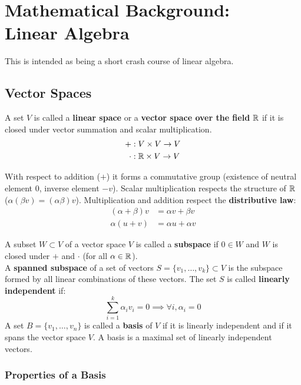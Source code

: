 \section[Mathematical Background: Linear Algebra]
	{Mathematical Background:\\Linear Algebra}%
\label{sec:linear_algebra}

This is intended as being a short crash course of linear algebra.

\subsection{Vector Spaces}%
\label{sub:vector_spaces}

A set $V$ is called a \textbf{linear space}
or a \textbf{vector space over the field} $\mathbb{R}$
if it is closed under vector summation and scalar multiplication.
\begin{align*}
	+ &: V \times V \rightarrow V \\
	\cdot &: \mathbb{R} \times V \rightarrow V
\end{align*}

With respect to addition ($+$) it forms a commutative group
(existence of neutral element $0$, inverse element $-v$).
Scalar multiplication respects the structure of $\mathbb{R}$ 
($\alpha(\beta v) = (\alpha \beta )v$).
Multiplication and addition respect the \textbf{distributive law}:
\begin{align*}
	( \alpha + \beta )v &= \alpha v + \beta v \\
	\alpha (u + v) & = \alpha u + \alpha v
\end{align*}

A subset $W \subset V$ of a vector space $V$
is called a \textbf{subspace} if $0 \in W$ and
$W$ is closed under $+$ and $\cdot$ (for all $\alpha \in \mathbb{R}$).\\

A \textbf{spanned subspace} of a set of vectors
$S = \{v_1, \hdots, v_k\} \subset V$ is the subspace
formed by all linear combinations of these vectors.
The set $S$ is called \textbf{linearly independent} if:
\[
	\sum_{i=1}^k \alpha_i v_i = 0 \implies \forall i, \alpha_i = 0
\]
A set $B = \{v_1, \hdots, v_n\}$ is called
a \textbf{basis} of $V$ if it is linearly independent and if it
spans the vector space $V$.
A basis is a maximal set of linearly independent vectors.


\subsubsection{Properties of a Basis}%
\label{ssub:properties_of_a_basis}


